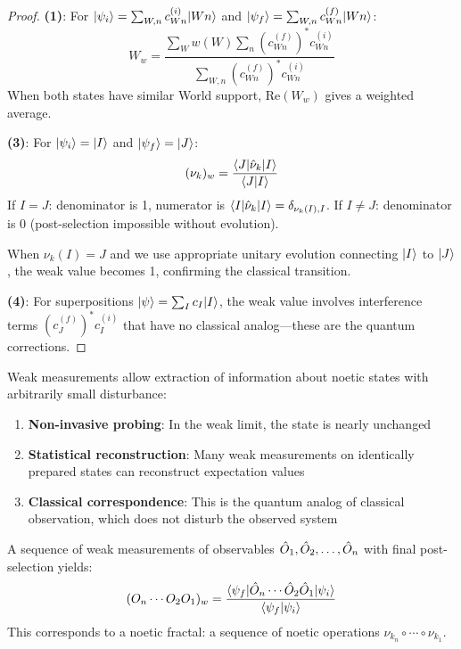 \begin{proof}
\textbf{(1)}: For $|\psi_i\rangle = \sum_{W,n} c_{Wn}^{(i)}|Wn\rangle$ and $|\psi_f\rangle = \sum_{W,n} c_{Wn}^{(f)}|Wn\rangle$:
\[
W_w = \frac{\sum_W w(W) \sum_n (c_{Wn}^{(f)})^* c_{Wn}^{(i)}}{\sum_{W,n} (c_{Wn}^{(f)})^* c_{Wn}^{(i)}}
\]
When both states have similar World support, $\mathrm{Re}(W_w)$ gives a weighted average.

\textbf{(3)}: For $|\psi_i\rangle = |I\rangle$ and $|\psi_f\rangle = |J\rangle$:
\[
(\nu_k)_w = \frac{\langle J|\hat{\nu}_k|I\rangle}{\langle J|I\rangle}
\]
If $I = J$: denominator is 1, numerator is $\langle I|\hat{\nu}_k|I\rangle = \delta_{\nu_k(I), I}$.
If $I \neq J$: denominator is 0 (post-selection impossible without evolution).

When $\nu_k(I) = J$ and we use appropriate unitary evolution connecting $|I\rangle$ to $|J\rangle$, the weak value becomes 1, confirming the classical transition.

\textbf{(4)}: For superpositions $|\psi\rangle = \sum_I c_I|I\rangle$, the weak value involves interference terms $(c_J^{(f)})^* c_I^{(i)}$ that have no classical analog---these are the quantum corrections.
\end{proof}

\begin{corollary}
\label{cor:observation-no-collapse}
Weak measurements allow extraction of information about noetic states with arbitrarily small disturbance:
\begin{enumerate}
  \item \textbf{Non-invasive probing}: In the weak limit, the state is nearly unchanged
  \item \textbf{Statistical reconstruction}: Many weak measurements on identically prepared states can reconstruct expectation values
  \item \textbf{Classical correspondence}: This is the quantum analog of classical observation, which does not disturb the observed system
\end{enumerate}
\end{corollary}

\begin{definition}
\label{def:sequential-weak}
A sequence of weak measurements of observables $\hat{O}_1, \hat{O}_2, \ldots, \hat{O}_n$ with final post-selection yields:
\[
(O_n \cdots O_2 O_1)_w = \frac{\langle \psi_f|\hat{O}_n \cdots \hat{O}_2 \hat{O}_1|\psi_i\rangle}{\langle\psi_f|\psi_i\rangle}
\]
This corresponds to a noetic fractal: a sequence of noetic operations $\nu_{k_n} \circ \cdots \circ \nu_{k_1}$.
\end{definition}

